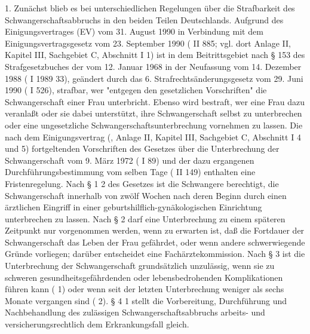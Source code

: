 \documentclass[12pt]{article}
\begin{document}
\begin{sourcepara}[title={原文理由 A.II.1}]
1. Zunächst blieb es bei unterschiedlichen Regelungen über die Strafbarkeit des Schwangerschaftsabbruchs in den beiden Teilen Deutschlands. Aufgrund des Einigungsvertrages (EV) vom 31. August 1990 in Verbindung mit dem Einigungsvertragsgesetz vom 23. September 1990 (\abbrBGBl{} II \abbrS{} 885; vgl. dort Anlage II, Kapitel III, Sachgebiet C, Abschnitt I \abbrNr{} 1) ist in dem Beitrittsgebiet nach § 153 des Strafgesetzbuches der \abbrDDR{} vom 12. Januar 1968 in der Neufassung vom 14. Dezember 1988 (\abbrGBlDDR{} I 1989 \abbrS{} 33), geändert durch das 6. Strafrechtsänderungsgesetz vom 29. Juni 1990 (\abbrGBlDDR{} I \abbrS{} 526), strafbar, wer "entgegen den gesetzlichen Vorschriften" die Schwangerschaft einer Frau unterbricht. Ebenso wird bestraft, wer eine Frau dazu veranlaßt oder sie dabei unterstützt, ihre Schwangerschaft selbst zu unterbrechen oder eine ungesetzliche Schwangerschaftsunterbrechung vornehmen zu lassen. Die nach dem Einigungsvertrag (\abbrAAO{}, Anlage II, Kapitel III, Sachgebiet C, Abschnitt I \abbrNr{} 4 und 5) fortgeltenden Vorschriften des Gesetzes über die Unterbrechung der Schwangerschaft vom 9. März 1972 (\abbrGBlDDR{} I \abbrS{} 89) und der dazu ergangenen Durchführungsbestimmung vom selben Tage (\abbrGBlDDR{} II \abbrS{} 149) enthalten eine Fristenregelung. Nach § 1 \abbrAbs{} 2 des Gesetzes ist die Schwangere berechtigt, die Schwangerschaft innerhalb von zwölf Wochen nach deren Beginn durch einen ärztlichen Eingriff in einer geburtshilflich-gynäkologischen Einrichtung unterbrechen zu lassen. Nach § 2 darf eine Unterbrechung zu einem späteren Zeitpunkt nur vorgenommen werden, wenn zu erwarten ist, daß die Fortdauer der Schwangerschaft das Leben der Frau gefährdet, oder wenn andere schwerwiegende Gründe vorliegen; darüber entscheidet eine Fachärztekommission. Nach § 3 ist die Unterbrechung der Schwangerschaft grundsätzlich unzulässig, wenn sie zu schweren gesundheitsgefährdenden oder lebensbedrohenden Komplikationen führen kann (\abbrAbs{} 1) oder wenn seit der letzten Unterbrechung weniger als sechs Monate vergangen sind (\abbrAbs{} 2). § 4 \abbrAbs{} 1 stellt die Vorbereitung, Durchführung und Nachbehandlung des zulässigen Schwangerschaftsabbruchs arbeits- und versicherungsrechtlich dem Erkrankungsfall gleich.
\end{sourcepara}
\end{document}
